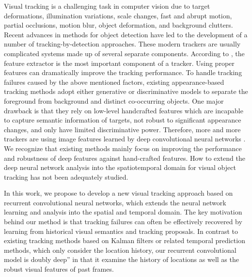 \documentclass{article}
\begin{document}
Visual tracking is a challenging task in computer vision due to target deformations, illumination variations, scale changes,  fast and abrupt motion, partial occlusions, motion blur, object deformation, and background clutters.
Recent advances in methods for object detection \citep{girshick2015fast, ren2015faster} have led to the development of a number of tracking-by-detection \citep{wang2016stct, hall2014categories, hong2015tracking} approaches. These modern trackers are usually complicated systems made up of several separate components. According to \citep{wang2015understanding}, the feature extractor is the most important component of a tracker. Using proper features can dramatically improve the tracking performance.
To handle tracking failures caused by the above mentioned factors, existing appearance-based tracking methods \citep{dinh2011context, kalal2010pn, henriques2012exploiting} adopt either generative or discriminative models to separate the foreground from background and distinct co-occurring objects. One major drawback is that they rely on low-level handcrafted features which are incapable to capture semantic information of targets, not robust to significant appearance changes, and only have limited discriminative power.
Therefore, more and more trackers are using image features learned by deep convolutional  neural networks \citep{Wang_2015_ICCV, hong2015tracking, wang2013learning}.
We recognize that existing methods mainly focus on  improving the performance and robustness of deep features against hand-crafted features. How to extend the deep neural network analysis into the spatiotemporal domain for visual object tracking has not been adequately studied.

In this work, we propose to develop a new  visual tracking approach based on recurrent convolutional neural networks,  which extends the neural network learning and analysis into the spatial and temporal domain. The key motivation behind our method is  that tracking failures can often be effectively recovered by learning from historical visual semantics and tracking proposals.
In contrast to existing tracking methods based on Kalman filters or related temporal prediction methods, which only consider
the location history, our recurrent convolutional model is doubly deep” in that it examine the history of locations as well as the robust visual features of past frames.
\end{document}
